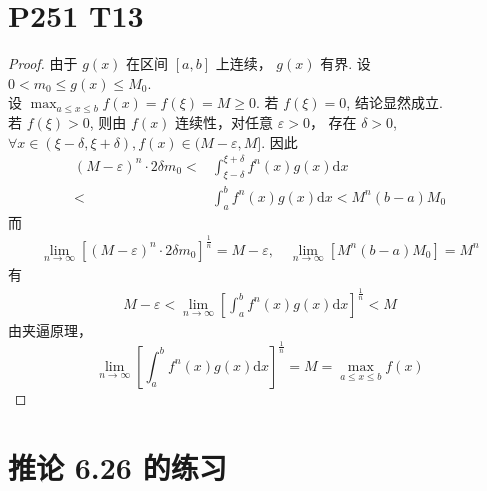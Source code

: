 \documentclass{article}
\newcommand{\dd}{\mathrm{d}}
\newcommand{\dx}{\dd x}
\begin{document}
\section*{P251 T13}

\begin{proof}
    由于 $g(x)$ 在区间 $[a, b]$ 上连续， $g(x)$ 有界. 设 $0 < m_0 \leqslant g(x) \leqslant M_0$. \\
    设 $\max_{a \leqslant x \leqslant b} f(x) = f(\xi) = M \geqslant 0$. 若 $f(\xi) = 0$, 结论显然成立. \\
    若 $f(\xi) > 0$, 则由 $f(x)$ 连续性，对任意 $\varepsilon > 0$， 存在 $\delta > 0$, $\forall x \in (\xi - \delta, \xi + \delta), f(x) \in (M - \varepsilon, M]$. 因此
    \begin{align*}
        (M - \varepsilon)^n\cdot 2\delta m_0 <& \int_{\xi - \delta}^{\xi + \delta}f^n(x)g(x)\dx \\
        <& \int_{a}^{b}f^n(x)g(x) \dx 
        < M^n (b - a) M_0
    \end{align*}
    而
    \begin{align*}
        \lim_{n \to \infty}\left[(M - \varepsilon)^n\cdot 2\delta m_0\right]^\frac{1}{n} = M - \varepsilon, \quad \lim_{n \to \infty}\left[M^n (b - a) M_0\right] = M^n
    \end{align*}
    有
    \begin{align}
        M - \varepsilon < \lim_{n \to \infty}\left[\int_{a}^{b}f^n(x)g(x) \dx\right]^\frac{1}{n} < M
    \end{align}
    由夹逼原理， \[\lim_{n \to \infty}\left[\int_{a}^{b}f^n(x)g(x) \dx\right]^\frac{1}{n} = M = \max_{a \leqslant x \leqslant b} f(x)\]
\end{proof}

\section*{推论 6.26 的练习}
\end{document}
